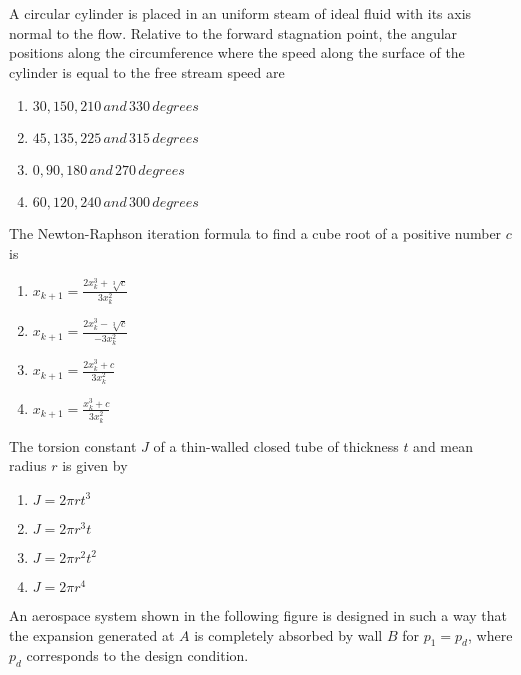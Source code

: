     \item A circular cylinder is placed in an uniform steam of ideal fluid with its axis normal to the flow. Relative to the forward stagnation point, the angular positions along the circumference where the speed along the surface of the cylinder is equal to the free stream speed are 
    \begin{enumerate}
        \item $30,150,210\,and\,330\,degrees$
        \item $45,135,225\,and\,315\,degrees$
        \item $0,90,180\,and\,270\,degrees$
        \item $60,120,240\,and\,300\,degrees$
    \end{enumerate}
    \item The Newton-Raphson iteration formula to find a cube root of a positive number $c$ is
    \begin{enumerate}
        \item $x_{k+1}=\frac{2x_k^3+\sqrt[3]{c}}{3x_k^2}$
        \item $x_{k+1}=\frac{2x_k^3-\sqrt[3]{c}}{-3x_k^2}$
        \item $x_{k+1}=\frac{2x_k^3+c}{3x_k^2}$
        \item $x_{k+1}=\frac{x_k^3+c}{3x_k^2}$
    \end{enumerate}
    \item The torsion constant $J$ of a thin-walled closed tube of thickness $t$ and mean radius $r$ is given by
    \begin{enumerate}
        \item $J=2\pi rt^3$
        \item $J=2\pi r^3t$
        \item $J=2\pi r^2t^2$
        \item $J=2\pi r^4$
    \end{enumerate}
    \item An aerospace system shown in the following figure is designed in such a way that the expansion generated at $A$ is completely absorbed by  wall $B$ for $p_1=p_d$, where $p_d$ corresponds to the design condition.


